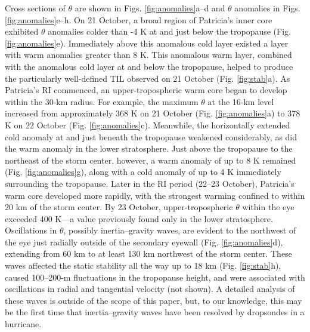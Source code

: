 Cross sections of $\theta$ are shown in Figs. \ref{fig:anomalies}a--d and $\theta$ anomalies in Figs. \ref{fig:anomalies}e–h.
On 21 October, a broad region of Patricia’s inner core exhibited $\theta$ anomalies colder than -4 K at and just below the tropopause (Fig. \ref{fig:anomalies}e).
Immediately above this anomalous cold layer existed a layer with warm anomalies greater than 8 K.
This anomalous warm layer, combined with the anomalous cold layer at and below the tropopause, helped to produce the particularly well-defined TIL observed on 21 October (Fig. \ref{fig:stab}a).
As Patricia’s RI commenced, an upper-tropospheric warm core began to develop within
the 30-km radius.
For example, the maximum $\theta$ at the 16-km level increased from approximately 368 K on 21 October (Fig. \ref{fig:anomalies}a) to 378 K on 22 October (Fig. \ref{fig:anomalies}c).
Meanwhile, the horizontally extended cold anomaly at and just beneath the tropopause weakened considerably, as did the warm anomaly in the lower stratosphere.
Just above the tropopause to the northeast of the storm center, however, a warm anomaly of up to 8 K remained (Fig. \ref{fig:anomalies}g), along with a cold anomaly of up to 4 K immediately surrounding the tropopause.
Later in the RI period (22--23 October), Patricia’s warm core developed more rapidly, with the strongest warming confined to within 20 km of the storm center.
By 23 October, upper-tropospheric $\theta$ within the eye exceeded 400 K---a value previously found only in the lower stratosphere.
Oscillations in $\theta$, possibly inertia--gravity waves, are evident to the northwest of the eye just radially outside of the secondary eyewall (Fig. \ref{fig:anomalies}d), extending from 60 km to at least 130 km northwest of the storm center.
These waves affected the static stability all the way up to 18 km (Fig. \ref{fig:stab}h), caused 100--200-m fluctuations in the tropopause height, and were associated with oscillations in radial and tangential velocity (not shown).
A detailed analysis of these waves is outside of the scope of this paper, but, to our knowledge, this may be the first time that inertia--gravity waves have been resolved by dropsondes in a hurricane.

